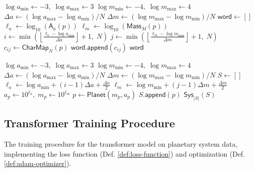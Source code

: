 \documentclass{amsart}
\theoremstyle{break}
\newcommand{\idx}[1]{\index{#1}}
\begin{document}
	\begin{algorithmic}[1]
		
		 
		\State $\log a_{\min} \gets -3,\; \log a_{\max} \gets 3$ 
		\State $\log m_{\min} \gets -4,\; \log m_{\max} \gets 4$
		\State $\Delta a \gets (\log a_{\max} - \log a_{\min}) / N$
		\State $\Delta m \gets (\log m_{\max} - \log m_{\min}) / N$
		\State $\mathsf{word} \gets []$
		\State $\ell_a \gets \log_{10}(\mathsf{A}_{a}(p))$ 
		\State $\ell_m \gets \log_{10}(\mathsf{Mass}_{M}(p))$ 
		\State $i \gets \min\left(\left\lfloor \frac{\ell_a - \log a_{\min}}{\Delta a} \right\rfloor + 1,\; N\right)$
		\State $j \gets \min\left(\left\lfloor \frac{\ell_m - \log m_{\min}}{\Delta m} \right\rfloor + 1,\; N\right)$
		\State $c_{ij} \gets \mathsf{CharMap}_{N}(p)$ 
		\State $\mathsf{word}.\mathsf{append}(c_{ij})$
		\EndFor
		\State \Return $\mathsf{word}$ 
		\EndProcedure
		
		\Statex
		
		 
		\State $\log a_{\min} \gets -3,\; \log a_{\max} \gets 3$
		\State $\log m_{\min} \gets -4,\; \log m_{\max} \gets 4$
		\State $\Delta a \gets (\log a_{\max} - \log a_{\min}) / N$
		\State $\Delta m \gets (\log m_{\max} - \log m_{\min}) / N$
		\State $S \gets []$
		\State $\ell_a \gets \log a_{\min} + (i-1)\Delta a + \frac{\Delta a}{2}$
		\State $\ell_m \gets \log m_{\min} + (j-1)\Delta m + \frac{\Delta m}{2}$
		\State $a_p \gets 10^{\ell_a},\; m_p \gets 10^{\ell_m}$
		\State $p \gets \mathsf{Planet}(m_p, a_p)$ 
		\State $S.\mathsf{append}(p)$
		\EndFor
		\State \Return $\mathsf{Sys}_{|S|}(S)$ 
		\EndProcedure
		
	\end{algorithmic}
	
	\subsection{Transformer Training Procedure}
	\label{subsec:training-algorithm}
	\idx{training algorithm}
	
	The training procedure for the transformer model on planetary system data, implementing the loss function (Def. \ref{def:loss-function}) and optimization (Def. \ref{def:adam-optimizer}).
	
\end{document}

